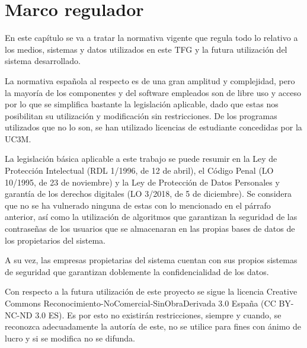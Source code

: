 \chapter{Marco regulador}\label{ch:marco}
En este capítulo se va a tratar la normativa vigente que regula todo lo relativo a los medios, sistemas y datos utilizados en este TFG y la futura utilización del sistema desarrollado.

La normativa española al respecto es de una gran amplitud y complejidad, pero la mayoría de los componentes y del software empleados son de libre uso y acceso por lo que se simplifica bastante la legislación aplicable, dado que estas nos posibilitan su utilización y modificación sin restricciones. De los programas utilizados que no lo son, se han utilizado licencias de estudiante concedidas por la UC3M\@.

La legislación básica aplicable a este trabajo se puede resumir en la Ley de Protección Intelectual (RDL 1/1996, de 12 de abril), el Código Penal (LO 10/1995, de 23 de noviembre) y la Ley de Protección de Datos Personales y garantía de los derechos digitales (LO 3/2018, de 5 de diciembre). Se considera que no se ha vulnerado ninguna de estas con lo mencionado en el párrafo anterior, así como la utilización de algoritmos que garantizan la seguridad de las contraseñas de los usuarios que se almacenaran en las propias bases de datos de los propietarios del sistema.

A su vez, las empresas propietarias del sistema cuentan con sus propios sistemas de seguridad que garantizan doblemente la confidencialidad de los datos.

Con respecto a la futura utilización de este proyecto se sigue la licencia Creative Commons Reconocimiento-NoComercial-SinObraDerivada 3.0 España (CC BY-NC-ND 3.0 ES). Es por esto no existirán restricciones, siempre y cuando, se reconozca adecuadamente la autoría de este, no se utilice para fines con ánimo de lucro y si se modifica no se difunda.